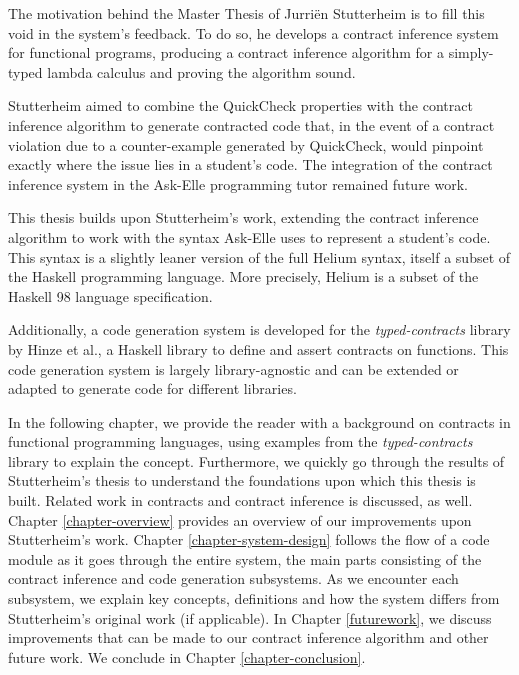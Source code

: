 \documentclass[10pt]{report}
\begin{document}
The motivation behind the Master Thesis of Jurri\"en Stutterheim \cite{Stutterheim:2013:thesis} is to fill this void in the system's feedback.
To do so, he develops a contract inference system for functional programs, producing a contract inference algorithm for a simply-typed lambda calculus and proving the algorithm sound.

Stutterheim aimed to combine the QuickCheck properties with the contract inference algorithm to generate contracted code that, in the event of a contract violation due to a counter-example generated by QuickCheck, would pinpoint exactly where the issue lies in a student's code.
The integration of the contract inference system in the Ask-Elle programming tutor remained future work.

This thesis builds upon Stutterheim's work, extending the contract inference algorithm to work with the syntax Ask-Elle uses to represent a student's code.
This syntax is a slightly leaner version of the full Helium syntax, itself a subset of the Haskell programming language.
More precisely, Helium is a subset of the Haskell 98 language specification.

Additionally, a code generation system is developed for the \textit{typed-contracts} library by Hinze et al.\cite{Hinze06typedcontracts}, a Haskell library to define and assert contracts on functions.
This code generation system is largely library-agnostic and can be extended or adapted to generate code for different libraries.

In the following chapter, we provide the reader with a background on contracts in functional programming languages, using examples from the \textit{typed-contracts} library to explain the concept.
Furthermore, we quickly go through the results of Stutterheim's thesis to understand the foundations upon which this thesis is built.
Related work in contracts and contract inference is discussed, as well.
Chapter \ref{chapter-overview} provides an overview of our improvements upon Stutterheim's work.
Chapter \ref{chapter-system-design} follows the flow of a code module as it goes through the entire system, the main parts consisting of the contract inference and code generation subsystems.
As we encounter each subsystem, we explain key concepts, definitions and how the system differs from Stutterheim's original work (if applicable).
In Chapter \ref{futurework}, we discuss improvements that can be made to our contract inference algorithm and other future work.
We conclude in Chapter \ref{chapter-conclusion}.
\end{document}
